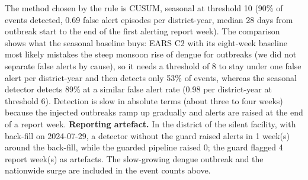 \documentclass[conference]{IEEEtran}
\begin{document}
The method chosen by the rule is CUSUM, seasonal at threshold 10 (90\% of events detected, 0.69 false alert episodes per district-year, median 28 days from outbreak start to the end of the first alerting report week). The comparison shows what the seasonal baseline buys: EARS C2 with its eight-week baseline most likely mistakes the steep monsoon rise of dengue for outbreaks (we did not separate false alerts by cause), so it needs a threshold of 8 to stay under one false alert per district-year and then detects only 53\% of events, whereas the seasonal detector detects 89\% at a similar false alert rate (0.98 per district-year at threshold 6). Detection is slow in absolute terms (about three to four weeks) because the injected outbreaks ramp up gradually and alerts are raised at the end of a report week. \textbf{Reporting artefact.} In the district of the silent facility, with back-fill on 2024-07-29, a detector without the guard raised alerts in 1 week(s) around the back-fill, while the guarded pipeline raised 0; the guard flagged 4 report week(s) as artefacts. The slow-growing dengue outbreak and the nationwide surge are included in the event counts above.
\end{document}
